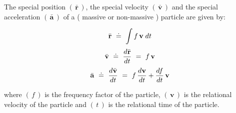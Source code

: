 \documentclass[10pt,fleqn]{article}
\begin{document}
\newpage

\par {}

\bigskip \smallskip

\noindent The special position $( \, \bar{\mathbf{r}} \, )$, the special velocity $( \, \bar{\mathbf{v}} \, )$ and the special acceleration $( \, \bar{\mathbf{a}} \, )$ of a ( massive or non-massive ) particle are given by:
\par \vspace{-0.30em}
\begin{eqnarray*}
\bar{\mathbf{r}} ~\doteq~ \int f \, \mathbf{v} \; d\hspace{+0.012em}t
\end{eqnarray*}
\vspace{-0.45em}
\begin{eqnarray*}
\bar{\mathbf{v}} ~\doteq~ \dfrac{d\hspace{+0.036em}\bar{\mathbf{r}}}{d\hspace{+0.012em}t} ~=~ f \, \mathbf{v}
\end{eqnarray*}
\vspace{-0.30em}
\begin{eqnarray*}
\bar{\mathbf{a}} ~\doteq~ \dfrac{d\hspace{+0.021em}\bar{\mathbf{v}}}{d\hspace{+0.012em}t} ~=~ f \, \dfrac{d\hspace{+0.021em}\mathbf{v}}{d\hspace{+0.012em}t} + \dfrac{d\hspace{-0.12em}f}{d\hspace{+0.012em}t} \, \mathbf{v}
\end{eqnarray*}
\par \vspace{+1.20em}
\noindent where $( \, f \, )$ is the frequency factor of the particle, $( \, \mathbf{v} \, )$ is the relational velocity of the particle and $( \, t \, )$ is the relational time of the particle.

\vspace{+0.60em}

\par {}
\end{document}
